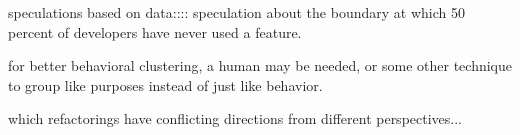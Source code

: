 speculations based on data::::
speculation about the boundary at which 50 percent of developers have never used a feature.


for better behavioral clustering, a human may be needed, or some other technique to group like purposes instead of just like behavior.



which refactorings have conflicting directions from different perspectives...








